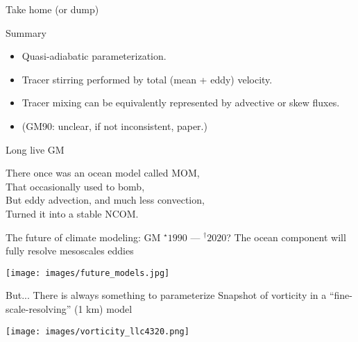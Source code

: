 \documentclass{beamer}
\begin{document}
\begin{frame}{Take home (or dump)}
\begin{block}{Summary}
\begin{itemize}
\item Quasi-adiabatic parameterization.
\item Tracer stirring performed by total (mean + eddy) velocity.
\item Tracer mixing can be equivalently represented by advective or skew fluxes.
\item (GM90: unclear, if not inconsistent, paper.)
\end{itemize}
\end{block}

\begin{exampleblock}{Long live GM}
\begin{center}
There once was an ocean model called MOM,\\
That occasionally used to bomb,\\
But eddy advection, and much less convection,\\
Turned it into a stable NCOM.\\
\end{center}
\vspace{-.75cm}
\end{exampleblock}

\end{frame}

\begin{frame}{The future of climate modeling: GM $^\star 1990$ --- $^\dagger 2020$?}
{The ocean component will fully resolve mesoscales eddies}
\begin{center}
{\texttt{[image: images/future\_models.jpg]}}
\end{center}
\end{frame}

\begin{frame}{But...}
{There is always something to parameterize}
Snapshot of vorticity in a ``fine-scale-resolving'' (1 km) model
\begin{center}
{\texttt{[image: images/vorticity\_llc4320.png]}}
\end{center}
\end{frame}
\end{document}
